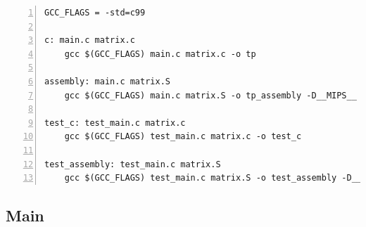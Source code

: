\documentclass[11pt,a4paper]{article}
\begin{document}
\begin{lstlisting}[numbers=left, tabsize=2, basicstyle=\fontsize{11}{13}\ttfamily, frame=single, caption={makefile}]
GCC_FLAGS = -std=c99

c: main.c matrix.c
	gcc $(GCC_FLAGS) main.c matrix.c -o tp

assembly: main.c matrix.S
	gcc $(GCC_FLAGS) main.c matrix.S -o tp_assembly -D__MIPS__

test_c: test_main.c matrix.c
	gcc $(GCC_FLAGS) test_main.c matrix.c -o test_c

test_assembly: test_main.c matrix.S
	gcc $(GCC_FLAGS) test_main.c matrix.S -o test_assembly -D__MIPS__

\end{lstlisting}

\subsection{Main}
\end{document}
